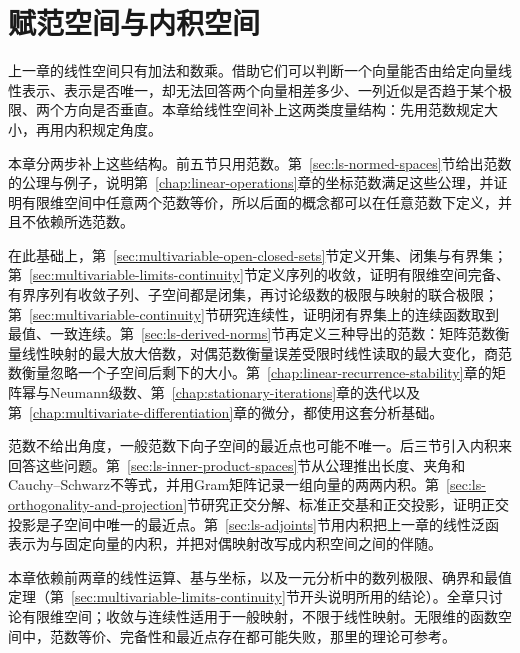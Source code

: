 \chapter{赋范空间与内积空间}
\label{chap:normed-inner-product-spaces}

上一章的线性空间只有加法和数乘。借助它们可以判断一个向量能否由给定向量线性表示、表示是否唯一，却无法回答两个向量相差多少、一列近似是否趋于某个极限、两个方向是否垂直。本章给线性空间补上这两类度量结构：先用范数规定大小，再用内积规定角度。

本章分两步补上这些结构。前五节只用范数。第~\ref{sec:ls-normed-spaces}节给出范数的公理与例子，说明第~\ref{chap:linear-operations}章的坐标范数满足这些公理，并证明有限维空间中任意两个范数等价，所以后面的概念都可以在任意范数下定义，并且不依赖所选范数。

在此基础上，第~\ref{sec:multivariable-open-closed-sets}节定义开集、闭集与有界集；第~\ref{sec:multivariable-limits-continuity}节定义序列的收敛，证明有限维空间完备、有界序列有收敛子列、子空间都是闭集，再讨论级数的极限与映射的联合极限；第~\ref{sec:multivariable-continuity}节研究连续性，证明闭有界集上的连续函数取到最值、一致连续。第~\ref{sec:ls-derived-norms}节再定义三种导出的范数：矩阵范数衡量线性映射的最大放大倍数，对偶范数衡量误差受限时线性读取的最大变化，商范数衡量忽略一个子空间后剩下的大小。第~\ref{chap:linear-recurrence-stability}章的矩阵幂与Neumann级数、第~\ref{chap:stationary-iterations}章的迭代以及第~\ref{chap:multivariate-differentiation}章的微分，都使用这套分析基础。

范数不给出角度，一般范数下向子空间的最近点也可能不唯一。后三节引入内积来回答这些问题。第~\ref{sec:ls-inner-product-spaces}节从公理推出长度、夹角和Cauchy--Schwarz不等式，并用Gram矩阵记录一组向量的两两内积。第~\ref{sec:ls-orthogonality-and-projection}节研究正交分解、标准正交基和正交投影，证明正交投影是子空间中唯一的最近点。第~\ref{sec:ls-adjoints}节用内积把上一章的线性泛函表示为与固定向量的内积，并把对偶映射改写成内积空间之间的伴随。

本章依赖前两章的线性运算、基与坐标，以及一元分析中的数列极限、确界和最值定理（第~\ref{sec:multivariable-limits-continuity}节开头说明所用的结论）。全章只讨论有限维空间；收敛与连续性适用于一般映射，不限于线性映射。无限维的函数空间中，范数等价、完备性和最近点存在都可能失败，那里的理论可参考。




